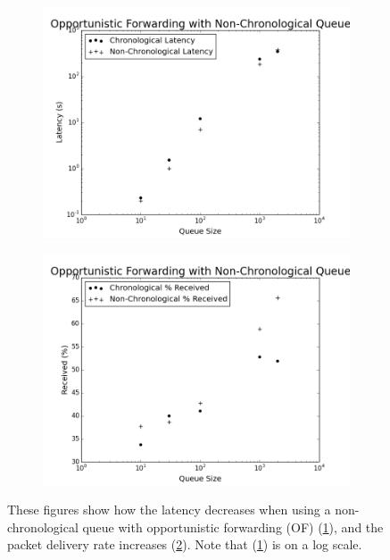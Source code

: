         \begin{figure}
            \centering
            \begin{subfigure}{\textwidth}
                \centering
                \includegraphics[width=\linewidth]{./images/OF_Non_Chron_Latency.png}
                \caption{}
                \label{fig:of_non_chron_latency}
            \end{subfigure}
            \begin{subfigure}{\textwidth}
                \includegraphics[width=\linewidth]{./images/OF_Non_Chron_Received.png}
                \caption{}
                \label{fig:of_non_chron_received}
            \end{subfigure}
            \caption{These figures show how the latency decreases when using a non-chronological queue with opportunistic forwarding (OF) (\ref{fig:of_non_chron_latency}), and the packet delivery rate increases (\ref{fig:of_non_chron_received}). Note that (\ref{fig:of_non_chron_latency}) is on a log scale.}
            \label{fig:priority_queue}
        \end{figure}

